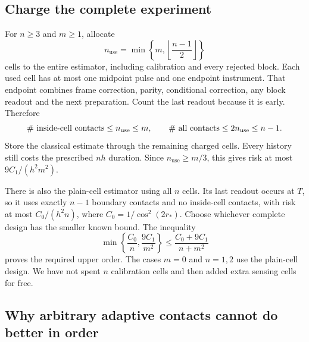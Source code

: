 \documentclass[11pt,a4paper]{article}
\numberwithin{equation}{section}
\theoremstyle{remark}
\begin{document}
\subsection{Charge the complete experiment}
\label{con:accounting}

For $n\ge3$ and $m\ge1$, allocate
\begin{equation}
 n_{\mathrm{use}}=\min\left\{m,\left\lfloor\frac{n-1}{2}\right\rfloor\right\}
\end{equation}
cells to the entire estimator, including calibration and every rejected
block. Each used cell has at most one midpoint pulse and one endpoint
instrument. That endpoint combines frame correction, parity, conditional
correction, any block readout and the next preparation. Count the last
readout because it is early. Therefore
\begin{equation}
 \#\hbox{ inside-cell contacts}\le n_{\mathrm{use}}\le m,
 \qquad \#\hbox{ all contacts}\le2n_{\mathrm{use}}\le n-1.
\end{equation}
Store the classical estimate through the remaining charged cells.
Every history still costs the prescribed $nh$ duration. Since $n_{\mathrm{use}}\ge m/3$,
this gives risk at most $9C_1/(h^2m^2)$.

There is also the plain-cell estimator using all $n$ cells. Its last
readout occurs at $T$, so it uses exactly $n-1$ boundary contacts and no
inside-cell contacts, with risk at most $C_0/(h^2n)$, where
$C_0=1/\cos^2(2r_*)$. Choose whichever complete design has the smaller
known bound. The inequality
\begin{equation}
 \min\left\{\frac{C_0}{n},\frac{9C_1}{m^2}\right\}
 \le\frac{C_0+9C_1}{n+m^2}
\end{equation}
proves the required upper order. The cases $m=0$ and $n=1,2$ use the
plain-cell design. We have not spent $n$ calibration cells and then added
extra sensing cells for free.

\subsection{Why arbitrary adaptive contacts cannot do better in order}
\label{con:converse}
\end{document}
